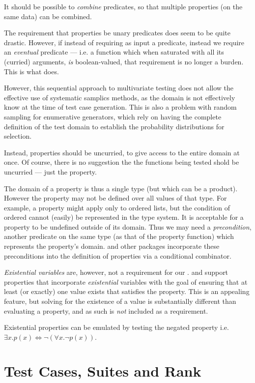 It should be possible to \emph{combine} predicates, so that multiple
properties (on the same data) can be combined.

The requirement that properties be unary predicates does seem to be
quite drastic.  However, if instead of requiring as input a predicate,
instead we require an \emph{eventual} predicate --- i.e. a function
which when saturated with all its (curried) arguments, \emph{is}
boolean-valued, that requirement is no longer a burden.  This is what
\QC does.

However, this sequential approach to multivariate testing does not allow
the effective use of systematic samplics methods, as the domain is not
effectively know at the time of test case generation. This is also
a problem with random sampling for enumerative generators,
which rely on having the complete definition of the test domain to
establish the probability distributions for selection.

Instead, properties should be uncurried, to give access to the entire
domain at once. Of course, there is no suggestion the the functions being
tested shold be uncurried --- just the property.

The domain of a property is thus a single type (but which can be a 
product). However the property may not be defined over all values of that
type.  For example, a property might apply only to ordered lists,
but the condition of ordered cannot (easily) be represented in the type system.
It is acceptable for a property to be undefined outside of its domain.
Thus we may need a \emph{precondition}, another predicate on the same
type (as that of the property function) which represents the 
property's domain.  \QC and other packages incorporate these preconditions
into the definition of properties via a conditional combinator.

\emph{Existential variables} are, however, not a requirement for our \pbt.
\SC and \GAST support properties that incorporate \emph{existential} variables
with the goal of ensuring that at least (or exactly) one value exists that
satisfies the property.  This is an appealing feature,
but solving for the existence of a value is substantially different than
evaluating a property, and as such is \emph{not} included as a
requirement.

Existential properties can be emulated by testing the negated property
i.e. $\exists x . p (x) \iff \neg (\forall x . \neg p (x))$.

\section{Test Cases, Suites and Rank} \label{reqtestsuite}

